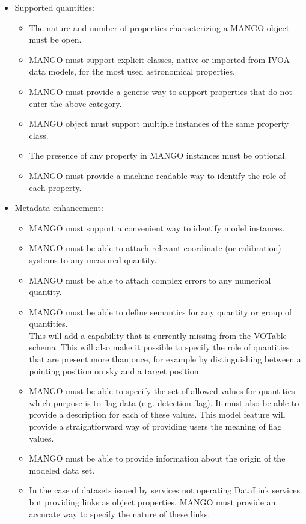 \documentclass[11pt,a4paper]{ivoa}
\begin{document}
\begin{itemize}
    \item Supported quantities:
        \begin{itemize}[noitemsep,topsep=0pt,parsep=0pt,partopsep=0pt]
          \item The nature and number of properties characterizing a MANGO object must be open. 
          \item MANGO must support explicit classes, native or imported from IVOA data models,
                for the most used astronomical properties.
          \item MANGO must provide a generic way to support properties that do not enter the above category.
          \item MANGO object must support multiple instances of the same property class.
          \item The presence of any property in MANGO instances must be optional.    
    	  \item MANGO must provide a machine readable way to identify the role of each property.
        
   	    \end{itemize}   
    
    \item Metadata enhancement:
        \begin{itemize}[noitemsep,topsep=0pt,parsep=0pt,partopsep=0pt]
          \item MANGO must support a convenient way to identify model instances.
          \item MANGO must be able to attach relevant coordinate (or calibration) 
                systems to any measured quantity. 
          \item MANGO must be able to attach complex errors to any numerical quantity. 
          \item MANGO must be able to define semantics for any quantity or group of quantities. \\
                This will add a capability that is currently missing from the VOTable schema. 
                This will also make it possible to specify the role of quantities 
                that are present more than once, for example by distinguishing between a pointing position on sky 
                and a target position. 
          \item MANGO must be able to specify the set of allowed values for quantities which purpose is to flag data 
                (e.g. detection flag). It must also be able to provide a description for each of these values. 
                This model feature will provide a straightforward way of providing users the meaning of flag values. 
          \item MANGO must be able to provide information about the origin of the modeled data set.         
          \item In the case of datasets issued by services not operating DataLink services  \citep{2023ivoa.spec.1215B} but providing 
                links as object properties, MANGO must provide an accurate way to specify the nature of these links. 
        \end{itemize}  
         

\end{itemize}
\end{document}
